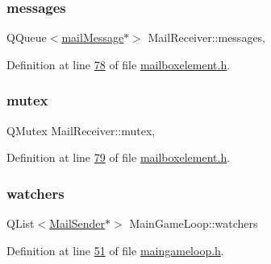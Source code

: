 \mbox{\label{a00197_ace6950e3788bb037f23ce8668ef83829}} 
\subsubsection{\texorpdfstring{messages}{messages}}
{\footnotesize\ttfamily Q\+Queue$<$\hyperlink{a00201}{mail\+Message}$\ast$$>$ Mail\+Receiver\+::messages\hspace{0.3cm}{\ttfamily [protected]}, {\ttfamily [inherited]}}



Definition at line \hyperlink{a00002_source_l00078}{78} of file \hyperlink{a00002_source}{mailboxelement.\+h}.

\mbox{\label{a00197_a116d4905d302bdb69c00b54b621dd827}} 
\subsubsection{\texorpdfstring{mutex}{mutex}}
{\footnotesize\ttfamily Q\+Mutex Mail\+Receiver\+::mutex\hspace{0.3cm}{\ttfamily [protected]}, {\ttfamily [inherited]}}



Definition at line \hyperlink{a00002_source_l00079}{79} of file \hyperlink{a00002_source}{mailboxelement.\+h}.

\mbox{\label{a00209_a14693d2e6fdac35ab6af44a9080871f2}} 
\subsubsection{\texorpdfstring{watchers}{watchers}}
{\footnotesize\ttfamily Q\+List$<$\hyperlink{a00205}{Mail\+Sender}$\ast$$>$ Main\+Game\+Loop\+::watchers\hspace{0.3cm}{\ttfamily [protected]}}



Definition at line \hyperlink{a00092_source_l00051}{51} of file \hyperlink{a00092_source}{maingameloop.\+h}.

